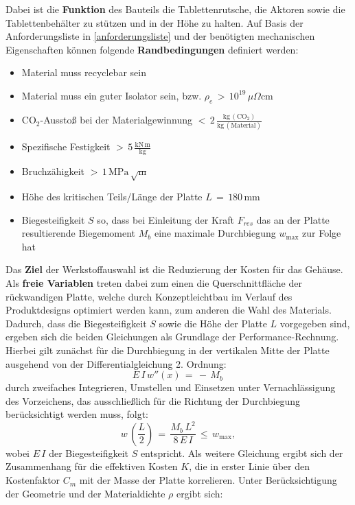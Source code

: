 Dabei ist die \textbf{Funktion} des Bauteils die Tablettenrutsche, die Aktoren sowie die Tablettenbehälter zu stützen und in der Höhe zu halten. Auf Basis der Anforderungsliste in \ref{anforderungsliste} und der benötigten mechanischen Eigenschaften können folgende \textbf{Randbedingungen} definiert werden:
\begin{itemize}
	\item Material muss recyclebar sein
	\item Material muss ein guter Isolator sein, bzw. $\rho_e\,>\,10^{19}\,\mu\Omega$cm
	\item CO$_2$-Ausstoß bei der Materialgewinnung $<\,2\,\frac{\text{kg}\,(\text{CO}_2)}{\text{kg}\,(\text{Material})}$
	\item Spezifische Festigkeit $>\,5\,\frac{\text{kN}\,\text{m}}{\text{kg}}$
	\item Bruchzähigkeit $>\,1\,\text{MPa}\,\sqrt{\text{m}}$
	\item Höhe des kritischen Teils/Länge der Platte $L\,=\,180\,$mm
	\item Biegesteifigkeit $S$ so, dass bei Einleitung der Kraft $F_{res}$ das an der Platte resultierende Biegemoment $M_b$ eine maximale Durchbiegung $w_{\text{max}}$ zur Folge hat
\end{itemize}
Das \textbf{Ziel} der Werkstoffauswahl ist die Reduzierung der Kosten für das Gehäuse. Als \textbf{freie Variablen} treten dabei zum einen die Querschnittfläche der rückwandigen Platte, welche durch Konzeptleichtbau im Verlauf des Produktdesigns optimiert werden kann, zum anderen die Wahl des Materials.
Dadurch, dass die Biegesteifigkeit $S$ sowie die Höhe der Platte $L$ vorgegeben sind, ergeben sich die beiden Gleichungen als Grundlage der Performance-Rechnung. Hierbei gilt zunächst für die Durchbiegung in der vertikalen Mitte der Platte ausgehend von der Differentialgleichung 2. Ordnung:
\begin{equation}
	E\,I\,w''(x)\,=\,-\,M_b\,
\end{equation}
durch zweifaches Integrieren, Umstellen und Einsetzen unter Vernachlässigung des Vorzeichens, das ausschließlich für die Richtung der Durchbiegung berücksichtigt werden muss, folgt:
\begin{equation} \label{durchbiegung}
	w\,\left(\frac{L}{2}\right)\,=\,\frac{M_b \,L^2}{8\,E\,I}\,\le\,w_{\text{max}},
\end{equation}
wobei $E\,I$ der Biegesteifigkeit $S$ entspricht. Als weitere Gleichung ergibt sich der Zusammenhang für die effektiven Kosten $K$, die in erster Linie über den Kostenfaktor $C_m$ mit der Masse der Platte korrelieren. Unter Berücksichtigung der Geometrie und der Materialdichte $\rho$ ergibt sich:

